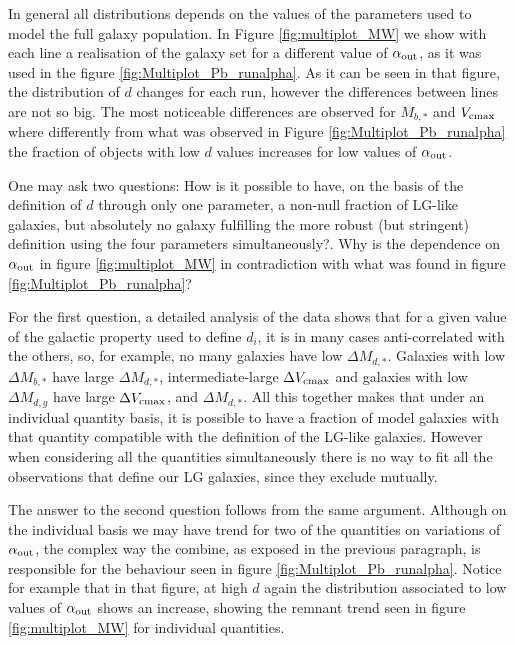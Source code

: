 \documentclass[useAMS,usenatbib]{mn2e}
\begin{document}
In general all distributions depends on the values of the parameters
used to model the full galaxy population. In Figure
\ref{fig:multiplot_MW} we show with each line a realisation of the
galaxy set for a different value of $\alpha_{\rm out}$, as it was used
in the figure \ref{fig:Multiplot_Pb_runalpha}. As it can be seen in
that figure, the distribution of $d$ changes for each run, however the
differences between lines are not so big. The most noticeable
differences are observed for $M_{b,*}$ and $V_{\rm cmax}$ where
differently from what was observed in Figure
\ref{fig:Multiplot_Pb_runalpha} the fraction of objects with low $d$
values increases for low values of $\alpha_{\rm out}$.

One may ask two questions: How is it possible to have, on the basis
of the definition of $d$ through only one parameter, a non-null
fraction of LG-like galaxies, but absolutely no galaxy fulfilling
the more robust (but stringent) definition using the four parameters
simultaneously?. Why is the dependence on $\alpha_{\rm out}$ in figure
\ref{fig:multiplot_MW} in contradiction with what was found in figure
\ref{fig:Multiplot_Pb_runalpha}?

For the first question, a detailed analysis of the data shows that for
a given value of the galactic property used to define $d_i$, it is in
many cases anti-correlated with the others, so, for example, no many
galaxies have low $\Delta M_{d,*}$. Galaxies with low $\Delta M_{b,*}$
have large $\Delta M_{d,*}$, intermediate-large $\Delta V_{\rm cmax}$
and galaxies with low $\Delta M_{d,g}$ have large $\Delta V_{\rm
  cmax}$, and $\Delta M_{d,*}$. All this together makes that under an
individual quantity basis, it is possible to have a fraction of model
galaxies with that quantity compatible with the definition of the
LG-like galaxies. However when considering all the quantities
simultaneously there is no way to fit all the observations that define
our LG galaxies, since they exclude mutually.

The answer to the second question follows from the same
argument. Although on the individual basis we may have trend for two
of the quantities on variations of $\alpha_{\rm out}$, the complex way
the combine, as exposed in the previous paragraph, is responsible for
the behaviour seen in figure \ref{fig:Multiplot_Pb_runalpha}. Notice
for example that in that figure, at high $d$ again the distribution
associated to low values of $\alpha_{\rm out}$ shows an increase,
showing the remnant trend seen in figure \ref{fig:multiplot_MW} for
individual quantities.
\end{document}
